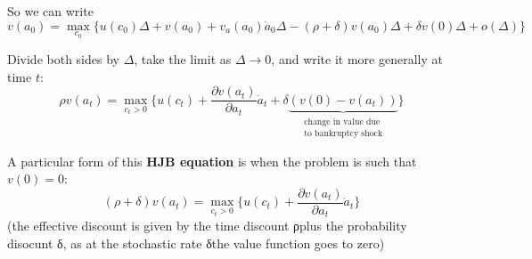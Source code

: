 So we can write \[
    v(a_0) = \max_{c_0} \{u(c_0)\Delta + v(a_0) + v_a(a_0)\dot{a}_0\Delta - (\rho + \delta)v(a_0)\Delta + \delta v(0)\Delta + o(\Delta)\}
\]

Divide both sides by $\Delta$, take the limit as $\Delta \to 0$, and write it more generally at time $t$: \[
    \rho v(a_t) = \max_{c_t > 0}\{u(c_t) + \frac{\partial v(a_t)}{\partial a_t}\dot{a}_t + \delta\underbrace{(v(0)-v(a_t))}_{\substack{\text{change in value due} \\ \text{to bankruptcy shock}}}\}
\]

A particular form of this \textbf{HJB equation} is when the problem is such that $v(0) = 0$: \[
    (\rho + \delta)v(a_t) = \max_{c_t > 0}\{u(c_t) + \frac{\partial v(a_t)}{\partial a_t} \dot{a}_t\}
\](the effective discount is given by the time discount ρplus the probability disocunt δ, as at the stochastic rate δthe value
function goes to zero)